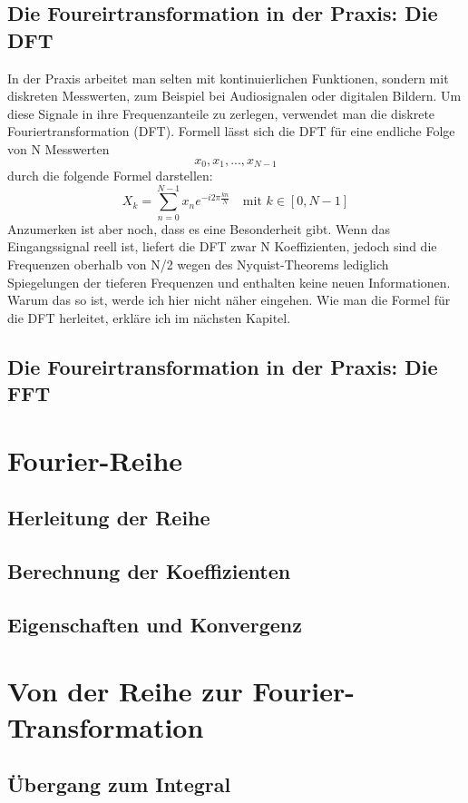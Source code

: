 \documentclass[a4paper,12pt]{article}
\theoremstyle{definition}
\theoremstyle{remark}
\begin{document}
\subsection{Die Foureirtransformation in der Praxis: Die DFT}
In der Praxis arbeitet man selten mit kontinuierlichen Funktionen, sondern mit diskreten Messwerten, zum Beispiel bei Audiosignalen oder digitalen Bildern. Um diese Signale in ihre Frequenzanteile zu zerlegen, verwendet man die diskrete Fouriertransformation (DFT).
Formell lässt sich die DFT für eine endliche Folge von N Messwerten
$$x_0, x_1,..., x_{N-1}$$
durch die folgende Formel darstellen:
$$X_k = \sum_{n = 0}^{N-1}{x_n e^{-i2\pi \frac{kn}{N}}} \quad \text{mit } k\in[0, N-1]$$
Anzumerken ist aber noch, dass es eine Besonderheit gibt. Wenn das Eingangssignal reell ist, 
liefert die DFT zwar N Koeffizienten, jedoch sind die Frequenzen oberhalb von N/2 wegen des 
Nyquist-Theorems lediglich Spiegelungen der tieferen Frequenzen und enthalten keine neuen 
Informationen. Warum das so ist, werde ich hier nicht näher eingehen. Wie man die Formel für 
die DFT herleitet, erkläre ich im nächsten Kapitel.

\subsection{Die Foureirtransformation in der Praxis: Die FFT}

\section{Fourier-Reihe}
\subsection{Herleitung der Reihe}
\subsection{Berechnung der Koeffizienten}
\subsection{Eigenschaften und Konvergenz}

\section{Von der Reihe zur Fourier-Transformation}
\subsection{Übergang zum Integral}
\end{document}
